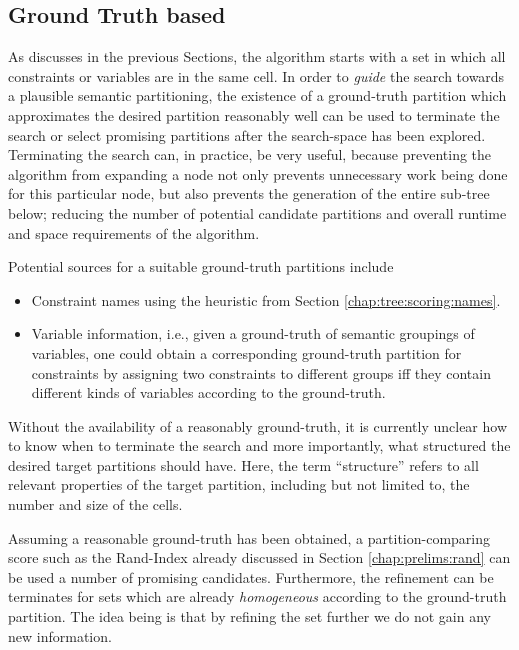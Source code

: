 			\clearpage
			

		\subsection{Ground Truth based}
		\label{chap:tree:scoring:groundtruth}
		
			As discusses in the previous Sections, the algorithm starts with a set in which all constraints or variables are in the same cell.
			In order to \textit{guide} the search towards a plausible semantic partitioning, the existence of a ground-truth partition which approximates the desired partition reasonably well can be used to terminate the search or select promising partitions after the search-space has been explored.
			Terminating the search can, in practice, be very useful, because preventing the algorithm from expanding a node not only prevents unnecessary work being done for this particular node, but also prevents the generation of the entire sub-tree below; reducing the number of potential candidate partitions and overall runtime and space requirements of the algorithm.
			
			Potential sources for a suitable ground-truth partitions include
			\begin{itemize}
				\item Constraint names using the heuristic from Section \ref{chap:tree:scoring:names}. 
				\item Variable information, i.e., given a ground-truth of semantic groupings of variables, one could obtain a corresponding ground-truth partition for constraints by assigning two constraints to different groups iff they contain different kinds of variables according to the ground-truth.
			\end{itemize}
			
			Without the availability of a reasonably ground-truth, it is currently unclear how to know when to terminate the search and more importantly, what structured the desired target partitions should have.
			Here, the term \enquote{structure} refers to all relevant properties of the target partition, including but not limited to, the number and size of the cells.
			
			Assuming a reasonable ground-truth has been obtained, a partition-comparing score such as the Rand-Index already discussed in Section \ref{chap:prelims:rand} can be used a number of promising candidates.
			Furthermore, the refinement can be terminates for sets which are already \textit{homogeneous} according to the ground-truth partition.
			The idea being is that by refining the set further we do not gain any new information.
			
